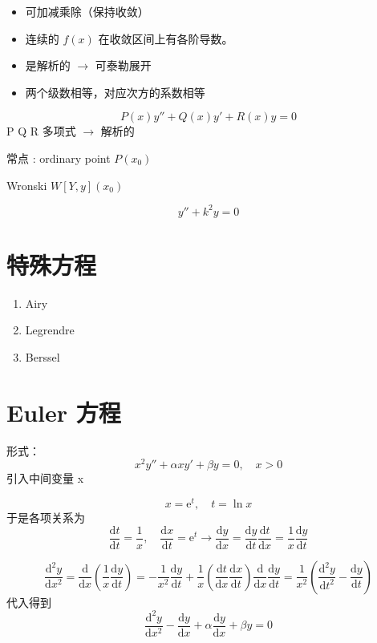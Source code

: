 \documentclass[11pt]{report}
\begin{document}
\begin{itemize}
\item 可加减乘除（保持收敛）
\item 连续的 \(f(x)\) 在收敛区间上有各阶导数。
\item 是解析的 \(\rightarrow\) 可泰勒展开
\item 两个级数相等，对应次方的系数相等
\end{itemize}

$$P(x)y''+Q(x)y'+R(x)y=0$$  
P Q R
多项式 \(\rightarrow\) 解析的

常点 : ordinary point
\(P(x_0)\)

Wronski
\(W[Y,y](x_0)\)

\begin{equation}
\label{eq:16}
y''+k^2y=0
\end{equation}


\section{特殊方程}
\label{sec:orge6ad9c6}
\begin{enumerate}
\item Airy
\label{sec:org1d82057}

\item Legrendre
\label{sec:org8816c69}
\item Berssel
\label{sec:orgcfc9a73}
\end{enumerate}
\section{Euler 方程}
\label{sec:org6900c72}
形式：
\begin{equation}
\label{eq:EulerEqu}
x^2y''+\alpha xy' +\beta y=0,\quad x>0
\end{equation}
引入中间变量 x

$$x=\mathrm{e}^t,\quad t=\ln x$$
于是各项关系为
\begin{equation}
\label{eq:9}
\frac{\mathrm{d}t}{\mathrm{d}t}=\frac{1}{x},\quad \frac{\mathrm{d}x}{\mathrm{d}t}=\mathrm{e}^t \rightarrow \frac{\mathrm{d}y}{\mathrm{d}x}=\frac{\mathrm{d}y}{\mathrm{d}t}\frac{\mathrm{d}t}{\mathrm{d}x}=\frac{1}{x}\frac{\mathrm{d}y}{\mathrm{d}t}
\end{equation}

$$\frac{\mathrm{d}^2y}{\mathrm{d}x^2}=\frac{\mathrm{d}}{\mathrm{d}x}(\frac{1}{x}\frac{\mathrm{d}y}{\mathrm{d}t})=-\frac{1}{x^2}\frac{\mathrm{d}y}{\mathrm{d}t}+\frac{1}{x}(\frac{\mathrm{d}t}{\mathrm{d}x}\frac{\mathrm{d}x}{\mathrm{d}t})\frac{\mathrm{d}}{\mathrm{d}x}\frac{\mathrm{d}y}{\mathrm{d}t}=\frac{1}{x^2}(\frac{\mathrm{d}^2y}{\mathrm{d}t^2}-\frac{\mathrm{d}y}{\mathrm{d}t})$$
代入得到
\begin{equation}
\label{eq:10}
\frac{\mathrm{d}^2y}{\mathrm{d}x^2}-\frac{\mathrm{d}y}{\mathrm{d}x}+\alpha \frac{\mathrm{d}y}{\mathrm{d}x}+\beta y=0
\end{equation}
\end{document}
